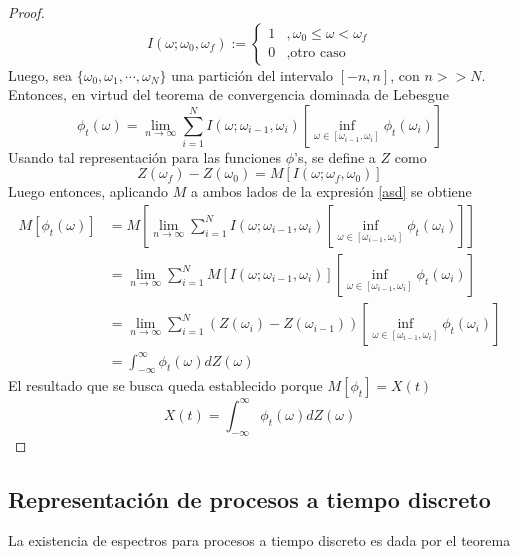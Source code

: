 \documentclass[12pt,letterpaper]{book}
\newcommand{\intR}{\int_{-\infty}^{\infty}}
\begin{document}
\begin{proof}
\begin{equation}
I(\omega; \omega_0, \omega_f) := \begin{cases}
1 &, \omega_0 \leq \omega < \omega_f \\
0 &, \text{otro caso}
\end{cases}
\end{equation}
Luego, sea $\{\omega_0, \omega_1, \cdots, \omega_N\}$ una partición del intervalo $[-n,n]$, con $n>>N$. Entonces, en virtud del teorema de convergencia dominada de Lebesgue
\begin{equation}
\phi_t(\omega) = \lim_{n\rightarrow\infty} \sum_{i=1}^{N} I(\omega; \omega_{i-1}, \omega_i) \left[  \inf_{\omega \in [\omega_{i-1},\omega_i]} \phi_t(\omega_{i})\right]
\label{asd}
\end{equation}
Usando tal representación para las funciones $\phi$'s, se define a $Z$ como
\begin{equation}
Z(\omega_f) - Z(\omega_0) = M\left[ I(\omega; \omega_f, \omega_0) \right]
\end{equation}
Luego entonces, aplicando $M$ a ambos lados de la expresión \ref{asd} se obtiene
\begin{align*}
M\left[ \phi_t(\omega) \right] &= M\left[ \lim_{n\rightarrow\infty} \sum_{i=1}^{N} I(\omega; \omega_{i-1}, \omega_i) \left[  \inf_{\omega \in [\omega_{i-1},\omega_i]} \phi_t(\omega_{i})\right] \right] \\
&= \lim_{n\rightarrow\infty} \sum_{i=1}^{N} M\left[I(\omega; \omega_{i-1}, \omega_i) \right] \left[  \inf_{\omega \in [\omega_{i-1},\omega_i]} \phi_t(\omega_{i})\right] \\
&= \lim_{n\rightarrow\infty} \sum_{i=1}^{N} \left( Z(\omega_i) - Z(\omega_{i-1})\right) \left[  \inf_{\omega \in [\omega_{i-1},\omega_i]} \phi_t(\omega_{i})\right] \\
&= \intR \phi_t(\omega) dZ(\omega)
\end{align*}
El resultado que se busca queda establecido porque $M[\phi_t] = X(t)$
\begin{equation}
X(t) = \intR \phi_t(\omega) dZ(\omega)
\end{equation}
\end{proof}

\subsection{Representación de procesos a tiempo discreto}

La existencia de espectros para procesos a tiempo discreto es dada por el teorema
\end{document}
